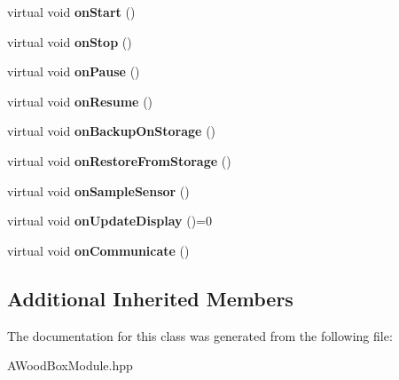 \begin{DoxyCompactItemize}
\mbox{\label{classwood_box_1_1module_1_1_a_wood_box_module_a9c5aacace73a2b517d46aa3b6e8372b1}} 
virtual void {\bfseries on\+Start} ()
\item 
\mbox{\label{classwood_box_1_1module_1_1_a_wood_box_module_a1f11dcfa08234f98ef24c5a56760244d}} 
virtual void {\bfseries on\+Stop} ()
\item 
\mbox{\label{classwood_box_1_1module_1_1_a_wood_box_module_a234337b583b213754f12002128be16e1}} 
virtual void {\bfseries on\+Pause} ()
\item 
\mbox{\label{classwood_box_1_1module_1_1_a_wood_box_module_a97234fef3565656e2e393fc57de67d04}} 
virtual void {\bfseries on\+Resume} ()
\item 
\mbox{\label{classwood_box_1_1module_1_1_a_wood_box_module_ab2a4491e12ddec61fe628dcc027825c7}} 
virtual void {\bfseries on\+Backup\+On\+Storage} ()
\item 
\mbox{\label{classwood_box_1_1module_1_1_a_wood_box_module_a8095147f19367e3dd9d22ed18453686a}} 
virtual void {\bfseries on\+Restore\+From\+Storage} ()
\item 
\mbox{\label{classwood_box_1_1module_1_1_a_wood_box_module_a40ee04d3474bb0f7be817ad37e5f23ab}} 
virtual void {\bfseries on\+Sample\+Sensor} ()
\item 
\mbox{\label{classwood_box_1_1module_1_1_a_wood_box_module_a5eadeb5a2ee1ec04625b3d485280a1df}} 
virtual void {\bfseries on\+Update\+Display} ()=0
\item 
\mbox{\label{classwood_box_1_1module_1_1_a_wood_box_module_a2507380c389c4233274c77459fcfd132}} 
virtual void {\bfseries on\+Communicate} ()
\end{DoxyCompactItemize}
\subsection*{Additional Inherited Members}


The documentation for this class was generated from the following file\+:\begin{DoxyCompactItemize}
\item 
A\+Wood\+Box\+Module.\+hpp\end{DoxyCompactItemize}
